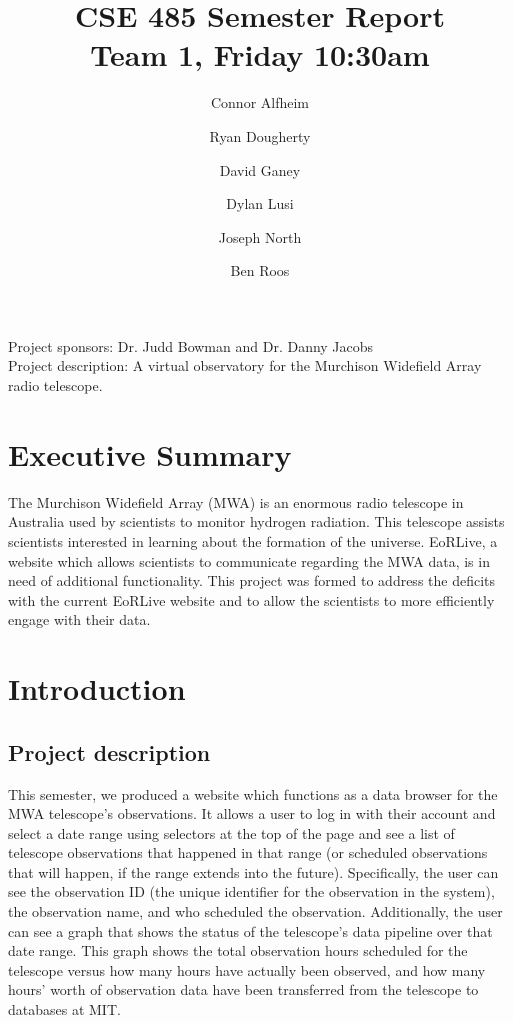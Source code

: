 \documentclass[12pt]{article}
\begin{document}
\begin{spacing}{.4}
\setlength{\droptitle}{-7em}
\title{CSE 485 Semester Report \\  Team 1, Friday 10:30am}
\author{Connor Alfheim \and Ryan Dougherty \and David Ganey \and Dylan Lusi \and Joseph North \and Ben Roos}
\maketitle
\end{spacing}

\begin{spacing}{1.5}
\noindent
Project sponsors: Dr. Judd Bowman and Dr. Danny Jacobs \\
Project description: A virtual observatory for the Murchison Widefield Array radio telescope.
\newpage

\tableofcontents
\newpage

\section{Executive Summary}
The Murchison Widefield Array (MWA) is an enormous radio telescope in Australia used by scientists to monitor hydrogen radiation. This telescope assists scientists interested in learning about the formation of the universe. EoRLive, a website which allows scientists to communicate regarding the MWA data, is in need of additional functionality. This project was formed to address the deficits with the current EoRLive website and to allow the scientists to more efficiently engage with their data.

\section{Introduction}
\subsection{Project description}
This semester, we produced a website which functions as a data browser for the MWA telescope's observations. It allows a user to log in with their account and select a date range using selectors at the top of the page and see a list of telescope observations that happened in that range (or scheduled observations that will happen, if the range extends into the future). Specifically, the user can see the observation ID (the unique identifier for the observation in the system), the observation name, and who scheduled the observation. Additionally, the user can see a graph that shows the status of the telescope's data pipeline over that date range. This graph shows the total observation hours scheduled for the telescope versus how many hours have actually been observed, and how many hours' worth of observation data have been transferred from the telescope to databases at MIT.

\end{spacing}
\end{document}
